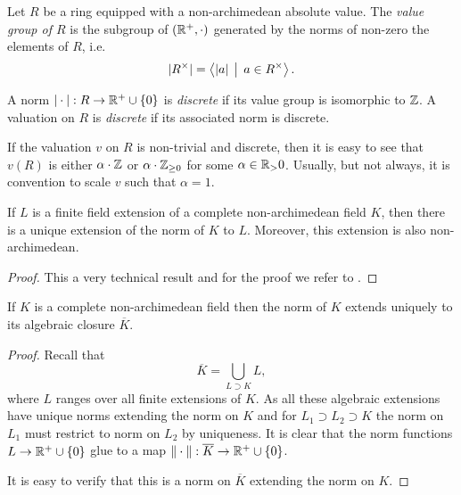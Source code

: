 \begin{definition}
	Let $R$ be a ring equipped with a non-archimedean absolute value. 
	The \emph{value group of $R$} is the subgroup of $(\mathbb{R}^{+}, \cdot )$ generated by the norms of non-zero the elements of $R$, i.e.\ \[
	|R^{\times }| =\left<|a| \st a \in R^{\times } \right> 
	.\] 
\end{definition}
\begin{definition}
	A norm $|\cdot |: R \to \mathbb{R}^{+} \cup \{0\} $ is \emph{discrete} if its value group is isomorphic to $\mathbb{Z}$. 
	A valuation on  $R$ is \emph{discrete} if its associated norm is discrete.
\end{definition}
If the valuation $v$ on $R$ is non-trivial and discrete, then it is easy to see that $v(R)$ is either $\alpha \cdot \mathbb{Z}$ or $\alpha \cdot \mathbb{Z}_{\ge 0}$ for some $\alpha \in \mathbb{R}_> 0$. 
Usually, but not always, it is convention to scale $v$ such that $\alpha = 1$. 



\begin{theorem}\label{thm:norm_finite_field_ext}
	If $L$ is a finite field extension of a complete non-archimedean field $K$, then there is a unique extension of the norm of $K$ to $L$. Moreover, this extension is also non-archimedean.
\end{theorem}
\begin{proof}
	This a very technical result and for the proof we refer to \cite[][appendix A]{boschLecturesFormalRigid2014}. 
\end{proof}
\begin{corollary}
	If $K$ is a complete non-archimedean field then the norm of  $K$ extends uniquely to its algebraic closure $\overline{K}$.
\end{corollary}
\begin{proof}
	Recall that \[
	\overline{K} = \bigcup_{L \supset K} L
	,\] 
	where $L$ ranges over all finite extensions of $K$. 
	As all these algebraic extensions have unique norms extending  the norm on $K$ and for $L_1 \supset L_2 \supset K$ the norm on  $L_1$ must restrict to norm on $L_2$ by uniqueness. 
	It is clear that the norm functions $L \to \mathbb{R}^{+} \cup \{0\} $ glue to a map $\|\cdot \|: \overline{K} \to \mathbb{R}^{+} \cup \{0\} $. 

	It is easy to verify that this is a norm on $\overline{K}$ extending the norm on $K$. 
\end{proof}

